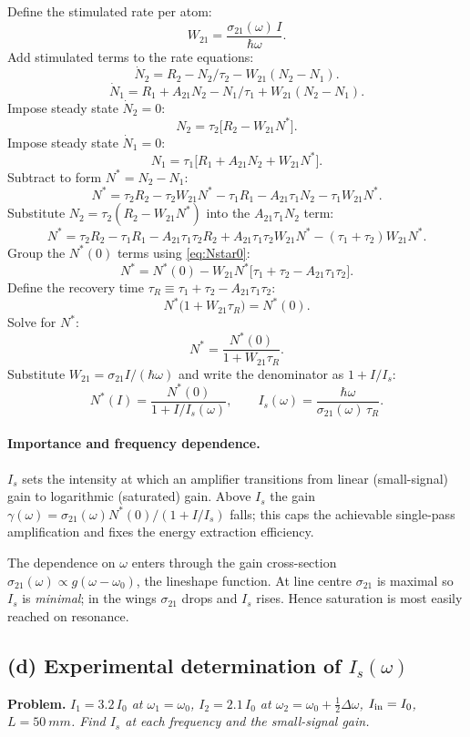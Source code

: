 \documentclass[11pt]{article}
\begin{document}
Define the stimulated rate per atom:
\[
W_{21}=\frac{\sigma_{21}(\omega)\,I}{\hbar\omega}.
\]
Add stimulated terms to the rate equations:
\[
\dot N_2=R_2-N_2/\tau_2-W_{21}(N_2-N_1).
\]
\[
\dot N_1=R_1+A_{21}N_2-N_1/\tau_1+W_{21}(N_2-N_1).
\]
Impose steady state $\dot N_2=0$:
\[
N_2=\tau_2\bigl[R_2-W_{21}N^{*}\bigr].
\]
Impose steady state $\dot N_1=0$:
\[
N_1=\tau_1\bigl[R_1+A_{21}N_2+W_{21}N^{*}\bigr].
\]
Subtract to form $N^{*}=N_2-N_1$:
\[
N^{*}=\tau_2 R_2-\tau_2 W_{21}N^{*}-\tau_1 R_1-A_{21}\tau_1 N_2-\tau_1 W_{21}N^{*}.
\]
Substitute $N_2=\tau_2(R_2-W_{21}N^{*})$ into the $A_{21}\tau_1 N_2$ term:
\[
N^{*}=\tau_2 R_2-\tau_1 R_1-A_{21}\tau_1\tau_2 R_2+A_{21}\tau_1\tau_2 W_{21}N^{*}-(\tau_1+\tau_2)W_{21}N^{*}.
\]
Group the $N^{*}(0)$ terms using \eqref{eq:Nstar0}:
\[
N^{*}=N^{*}(0)-W_{21}N^{*}\bigl[\tau_1+\tau_2-A_{21}\tau_1\tau_2\bigr].
\]
Define the recovery time $\tau_R\equiv \tau_1+\tau_2-A_{21}\tau_1\tau_2$:
\[
N^{*}\bigl(1+W_{21}\tau_R\bigr)=N^{*}(0).
\]
Solve for $N^{*}$:
\[
N^{*}=\frac{N^{*}(0)}{1+W_{21}\tau_R}.
\]
Substitute $W_{21}=\sigma_{21}I/(\hbar\omega)$ and write the denominator as $1+I/I_s$:
\begin{equation}
\boxed{\;N^{*}(I)=\frac{N^{*}(0)}{1+I/I_s(\omega)},\qquad I_s(\omega)=\frac{\hbar\omega}{\sigma_{21}(\omega)\,\tau_R}.\;}
\label{eq:Is}
\end{equation}

\paragraph{Importance and frequency dependence.} $I_s$ sets the intensity at which an amplifier transitions from linear (small-signal) gain to logarithmic (saturated) gain. Above $I_s$ the gain $\gamma(\omega)=\sigma_{21}(\omega)N^{*}(0)/(1+I/I_s)$ falls; this caps the achievable single-pass amplification and fixes the energy extraction efficiency.

The dependence on $\omega$ enters through the gain cross-section $\sigma_{21}(\omega)\propto g(\omega-\omega_0)$, the lineshape function. At line centre $\sigma_{21}$ is maximal so $I_s$ is \emph{minimal}; in the wings $\sigma_{21}$ drops and $I_s$ rises. Hence saturation is most easily reached on resonance.

\subsection*{(d) Experimental determination of $I_s(\omega)$}

\textbf{Problem.} \emph{$I_1=3.2\,I_0$ at $\omega_1=\omega_0$, $I_2=2.1\,I_0$ at $\omega_2=\omega_0+\tfrac12\Delta\omega$, $I_{\rm in}=I_0$, $L=\SI{50}{mm}$. Find $I_s$ at each frequency and the small-signal gain.}
\end{document}
